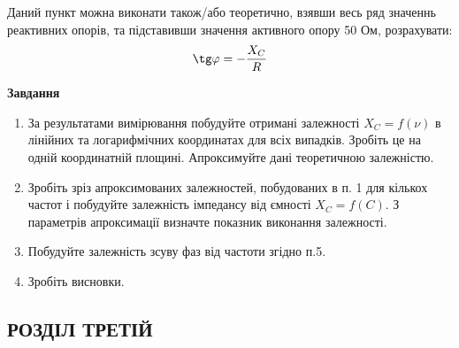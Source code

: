 \documentclass[a4paper,12pt]{article}
\begin{document}
\begin{justify}
    Даний пункт можна виконати також/або теоретично, взявши весь ряд значеннь 
    реактивних опорів, та підставивши значення активного опору 50 Ом, розрахувати:
    $$\tg\varphi=-\dfrac{X_C}{R}$$
    \begin{center}
		\textbf{Завдання}
	\end{center}
    \begin{enumerate}
        \item За результатами вимірювання побудуйте отримані залежності $X_C=f(\nu)$ в лінійних 
        та логарифмічних координатах для всіх випадків. Зробіть це на одній координатній площині. Апроксимуйте дані теоретичною залежністю.
        \item Зробіть зріз апроксимованих залежностей, побудованих в п. 1 для кількох частот 
        і побудуйте залежність імпедансу від ємності $X_C=f(C)$. З параметрів апроксимації 
        визначте показник виконання залежності.
        \item Побудуйте залежність зсуву фаз від частоти згідно п.5.
        \item Зробіть висновки.
    \end{enumerate}
    \newpage
    \begin{center}
    	\section* {РОЗДІЛ ТРЕТІЙ\\}
    \end{center}

\end{justify}
\end{document}
